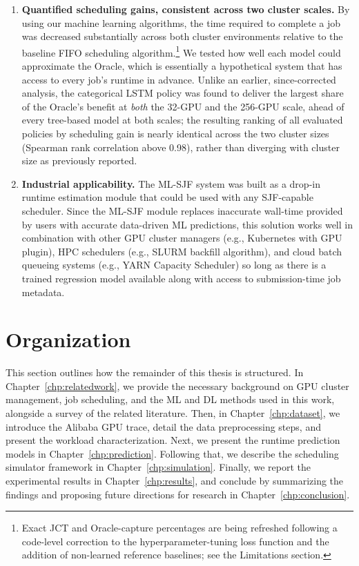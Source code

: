 \begin{enumerate}
    \clearpage
    \item \textbf{Quantified scheduling gains, consistent across two cluster scales.} By using our machine learning algorithms, the time required to complete a job was decreased substantially across both cluster environments relative to the baseline FIFO scheduling algorithm.\footnote{Exact JCT and Oracle-capture percentages are being refreshed following a code-level correction to the hyperparameter-tuning loss function and the addition of non-learned reference baselines; see the Limitations section.} We tested how well each model could approximate the Oracle, which is essentially a hypothetical system that has access to every job's runtime in advance. Unlike an earlier, since-corrected analysis, the categorical LSTM policy was found to deliver the largest share of the Oracle's benefit at \emph{both} the 32-GPU and the 256-GPU scale, ahead of every tree-based model at both scales; the resulting ranking of all evaluated policies by scheduling gain is nearly identical across the two cluster sizes (Spearman rank correlation above 0.98), rather than diverging with cluster size as previously reported.

    \item \textbf{Industrial applicability.} The ML-SJF system was built as a drop-in runtime estimation module that could be used with any SJF-capable scheduler. Since the ML-SJF module replaces inaccurate wall-time provided by users with accurate data-driven ML predictions, this solution works well in combination with other GPU cluster managers (e.g., Kubernetes with GPU plugin), HPC schedulers (e.g., SLURM backfill algorithm), and cloud batch queueing systems (e.g., YARN Capacity Scheduler) so long as there is a trained regression model available along with access to submission-time job metadata.
\end{enumerate}

\section{Organization}

This section outlines how the remainder of this thesis is structured. In Chapter~\ref{chp:relatedwork}, we provide the necessary background on GPU cluster management, job scheduling, and the ML and DL methods used in this work, alongside a survey of the related literature. Then, in Chapter~\ref{chp:dataset}, we introduce the Alibaba GPU trace, detail the data preprocessing steps, and present the workload characterization. Next, we present the runtime prediction models in Chapter~\ref{chp:prediction}. Following that, we describe the scheduling simulator framework in Chapter~\ref{chp:simulation}. Finally, we report the experimental results in Chapter~\ref{chp:results}, and conclude by summarizing the findings and proposing future directions for research in Chapter~\ref{chp:conclusion}.